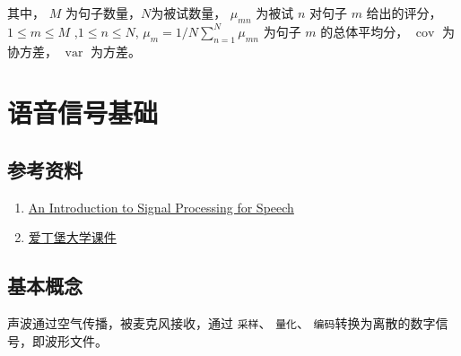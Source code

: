 \documentclass[cn,10pt,math=newtx,citestyle=gb7714-2015,bibstyle=gb7714-2015]{elegantbook}
\begin{document}
其中， $M$ 为句子数量，$N$为被试数量， $\mu_{mn}$ 为被试 $n$ 对句子 $m$ 给出的评分，$1\leq m\leq M$ ,$1\leq n\leq N$, $\mu_m=1/N\sum_{n=1}^N\mu_{mn}$ 为句子 $m$ 的总体平均分， $\mathop{cov}$ 为协方差， $\mathop{var}$ 为方差。

\chapter{语音信号基础}

\section{参考资料}

\begin{enumerate}
  \item \href{http://labrosa.ee.columbia.edu/~dpwe/pubs/Ellis10-introspeech.pdf}{An Introduction to Signal Processing for Speech}
  \item \href{https://www.inf.ed.ac.uk/teaching/courses/asr/2020-21/asr02-signal.pdf}{爱丁堡大学课件}
  
\end{enumerate}

\section{基本概念}
声波通过空气传播，被麦克风接收，通过 \lstinline{采样}、 \lstinline{量化}、 \lstinline{编码}转换为离散的数字信号，即波形文件。
\end{document}
